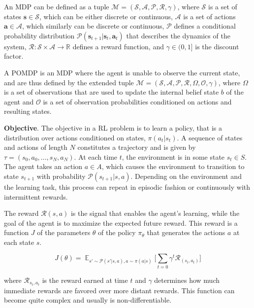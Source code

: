 An MDP can be defined as a tuple
$\mathcal{M} = (\mathcal{S}, \mathcal{A}, \mathcal{P}, \mathcal{R}, \gamma)$, where $\mathcal{S}$ is a set of states $\mathbf{s} \in \mathcal{S}$, which can be either discrete or continuous, $\mathcal{A}$ is a set of actions $\mathbf{a} \in  \mathcal{A}$, which similarly can be discrete or continuous, $ \mathcal{P}$ defines a conditional probability distribution $ \mathcal{P}(\mathbf{s}_{t+1}|\mathbf{s}_t, \mathbf{a}_t)$ that describes the dynamics of the system, $\mathcal{R} :  \mathcal{S} \times  \mathcal{A} \to  \mathbb{R}$ defines a reward function, and $\gamma \in (0, 1]$ is the discount factor.

A POMDP is an MDP where the agent is unable to observe the current state, and are thus defined by the extended tuple 
$\mathcal{M} = (\mathcal{S}, \mathcal{A}, \mathcal{P}, \mathcal{R}, \Omega, \mathcal{O}, \gamma)$, where $\Omega$ is a set of observations that are used to update the internal belief state $b$ of the agent and $\mathcal{O}$ is a set of observation probabilities conditioned on actions and resulting states.

\textbf{Objective}. The objective in a \gls{RL} problem is to learn a policy, that is a distribution over actions conditioned on states, $\pi(a_t|s_t)$.
A sequence of states and actions of length $N$ constitutes a trajectory and is given by $\tau = (s_0, a_0, . . . , s_N, a_N)$.
At each time $t$, the environment is in some state $s_t \in S$.
The agent takes an action $a \in A$, which causes the environment to transition to state $s_{t+1}$ with probability $\mathcal{P}(s_{t+1}|s,a)$.
Depending on the environment and the learning task, this process can repeat in episodic fashion or continuously with intermittent rewards.

The reward $\mathcal{R}(s,a)$ is the signal that enables the agent's learning, while the goal of the agent is to maximize the expected future reward.
This reward is a function $J$ of the parameters $\theta$ of the policy $\pi _{\theta}$ that generates the actions $a$ at each state $s$.

\begin{equation}
J(\theta)=\mathop{\mathbb{E}}_{s'\sim \mathcal{P}(s'|s,a), a\sim \pi (a|s)}\bigg[\sum _{t=0}\gamma ^{t}\mathcal{R}_(s_t, a_t)\bigg]
\end{equation}

where $\mathcal{R}_{s_t, a_t}$ is the reward earned at time $t$ and $\gamma$ determines how much immediate rewards are favored over more distant rewards.
This function can become quite complex and usually is non-differentiable.

